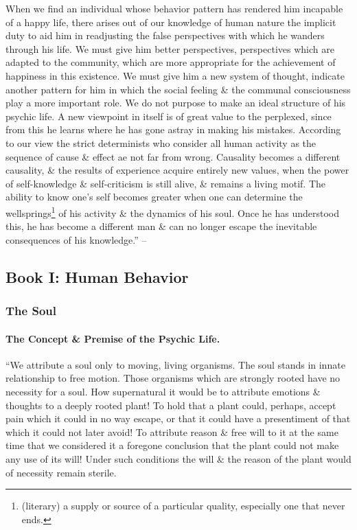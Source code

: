 \documentclass{article}
\begin{document}
When we find an individual whose behavior pattern has rendered him incapable of a happy life, there arises out of our knowledge of human nature the implicit duty to aid him in readjusting the false perspectives with which he wanders through his life. We must give him better perspectives, perspectives which are adapted to the community, which are more appropriate for the achievement of happiness in this existence. We must give him a new system of thought, indicate another pattern for him in which the social feeling \& the communal consciousness play a more important role. We do not purpose to make an ideal structure of his psychic life. A new viewpoint in itself is of great value to the perplexed, since from this he learns where he has gone astray in making his mistakes. According to our view the strict determinists who consider all human activity as the sequence of cause \& effect ae not far from wrong. Causality becomes a different causality, \& the results of experience acquire entirely new values, when the power of self-knowledge \& self-criticism is still alive, \& remains a living motif. The ability to know one's self becomes greater when one can determine the wellsprings\footnote{(literary) a supply or source of a particular quality, especially one that never ends.} of his activity \& the dynamics of his soul. Once he has understood this, he has become a different man \& can no longer escape the inevitable consequences of his knowledge.'' -- \cite[pp. 3--14]{Adler_human_nature}

\subsection{Book I: Human Behavior}

\subsubsection{The Soul}

\paragraph*{The Concept \& Premise of the Psychic Life.} ``We attribute a soul only to moving, living organisms. The soul stands in innate relationship to free motion. Those organisms which are strongly rooted have no necessity for a soul. How supernatural it would be to attribute emotions \& thoughts to a deeply rooted plant! To hold that a plant could, perhaps, accept pain which it could in no way escape, or that it could have a presentiment of that which it could not later avoid! To attribute reason \& free will to it at the same time that we considered it a foregone conclusion that the plant could not make any use of its will! Under such conditions the will \& the reason of the plant would of necessity remain sterile.
\end{document}
